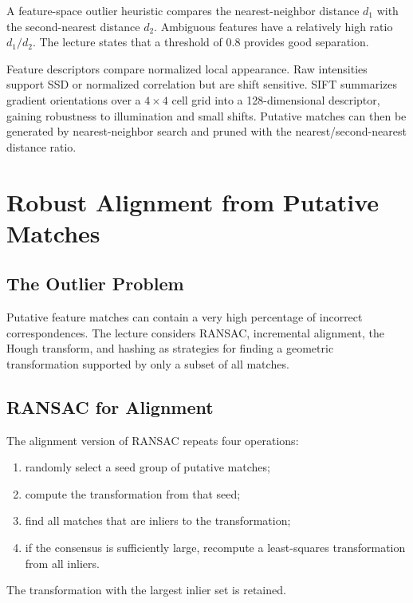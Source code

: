 \documentclass[11pt,a4paper,oneside]{report}
\begin{document}
A feature-space outlier heuristic compares the nearest-neighbor distance $d_1$ with the second-nearest distance $d_2$. Ambiguous features have a relatively high ratio $d_1/d_2$. The lecture states that a threshold of $0.8$ provides good separation.

\begin{chaptersummary}
Feature descriptors compare normalized local appearance. Raw intensities support SSD or normalized correlation but are shift sensitive. SIFT summarizes gradient orientations over a $4\times4$ cell grid into a 128-dimensional descriptor, gaining robustness to illumination and small shifts. Putative matches can then be generated by nearest-neighbor search and pruned with the nearest/second-nearest distance ratio.
\end{chaptersummary}

\chapter{Robust Alignment from Putative Matches}

\section{The Outlier Problem}

Putative feature matches can contain a very high percentage of incorrect correspondences. The lecture considers RANSAC, incremental alignment, the Hough transform, and hashing as strategies for finding a geometric transformation supported by only a subset of all matches.

\section{RANSAC for Alignment}

The alignment version of RANSAC repeats four operations:
\begin{enumerate}
  \item randomly select a seed group of putative matches;
  \item compute the transformation from that seed;
  \item find all matches that are inliers to the transformation;
  \item if the consensus is sufficiently large, recompute a least-squares transformation from all inliers.
\end{enumerate}
The transformation with the largest inlier set is retained.
\end{document}
